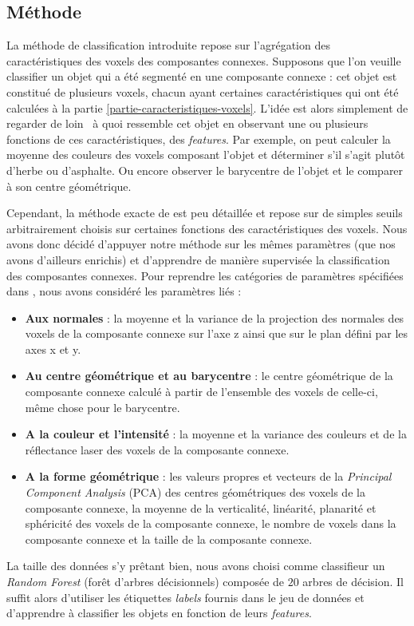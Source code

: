 \documentclass[a4paper, onecolumn, 11pt]{article}
\begin{document}
\subsection{Méthode}
La méthode de classification introduite repose sur l'agrégation des caractéristiques des voxels des composantes connexes. Supposons que l'on veuille classifier un objet qui a été segmenté en une composante connexe : cet objet est constitué de plusieurs voxels, chacun ayant certaines caractéristiques qui ont été calculées à la partie \ref{partie-caracteristiques-voxels}. L'idée est alors simplement de regarder \og de loin \fg\ à quoi ressemble cet objet en observant une ou plusieurs fonctions de ces caractéristiques, des \emph{features}. Par exemple, on peut calculer la moyenne des couleurs des voxels composant l'objet et déterminer s'il s'agit plutôt d'herbe ou d'asphalte. Ou encore observer le barycentre de l'objet et le comparer à son centre géométrique.

Cependant, la méthode exacte de \cite{aka_article} est peu détaillée et repose sur de simples seuils arbitrairement choisis sur certaines fonctions des caractéristiques des voxels. Nous avons donc décidé d'appuyer notre méthode sur les mêmes paramètres (que nos avons d'ailleurs enrichis) et d'apprendre de manière supervisée la classification des composantes connexes. Pour reprendre les catégories de paramètres spécifiées dans \cite{aka_article}, nous avons considéré les paramètres liés :
\begin{itemize}
\item \textbf{Aux normales} : la moyenne et la variance de la projection des normales des voxels de la composante connexe sur l'axe z ainsi que sur le plan défini par les axes x et y.
\item \textbf{Au centre géométrique et au barycentre} : le centre géométrique de la composante connexe calculé à partir de l'ensemble des voxels de celle-ci, même chose pour le barycentre.
\item \textbf{A la couleur et l'intensité} : la moyenne et la variance des couleurs et de la réflectance laser des voxels de la composante connexe.
\item \textbf{A la forme géométrique} : les valeurs propres et vecteurs de la \emph{Principal Component Analysis} (PCA) des centres géométriques des voxels de la composante connexe, la moyenne de la verticalité, linéarité, planarité et sphéricité  des voxels de la composante connexe, le nombre de voxels dans la composante connexe et la taille de la composante connexe.
\end{itemize}
La taille des données s'y prêtant bien, nous avons choisi comme classifieur un \emph{Random Forest} (forêt d'arbres décisionnels) composée de $20$ arbres de décision. Il suffit alors d'utiliser les étiquettes \emph{labels} fournis dans le jeu de données et d'apprendre à classifier les objets en fonction de leurs \emph{features}.
\end{document}
